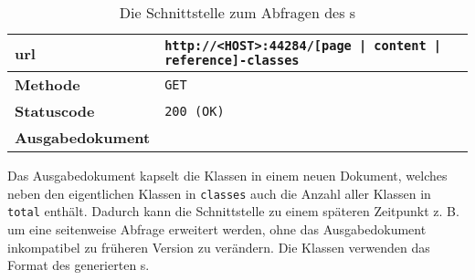     \begin{table}[htb]
        \centering
        \begin{tabular}{|l|l|}
        \hline
        \textbf{\gls{url}} & \texttt{http://<HOST>:44284/[page | content | reference]-classes}\\
        \hline
        \textbf{Methode} & \texttt{GET}\\
        \hline
        \textbf{Statuscode} & \texttt{200 (OK)}\\
        \hline
        \textbf{Ausgabedokument} & \\
        \hline
        \end{tabular}
        \caption{Die Schnittstelle zum Abfragen des {\classificationModel}s}
        \label{table:getClassesInterface}
    \end{table}

    Das Ausgabedokument kapselt die Klassen in einem neuen Dokument,
    welches neben den eigentlichen Klassen in \texttt{classes}
    auch die Anzahl aller Klassen in \texttt{total} enthält.
    Dadurch kann die Schnittstelle zu einem späteren Zeitpunkt z. B. um eine
    seitenweise Abfrage erweitert werden,
    ohne das Ausgabedokument inkompatibel zu früheren Version zu verändern.
    Die Klassen verwenden das Format des generierten
    {\classificationModel}s.
